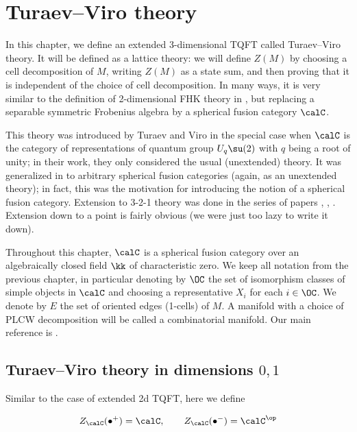 \chapter{Turaev--Viro theory}\label{c:TV}



In this chapter, we define an extended 3-dimensional TQFT called
Turaev--Viro theory. It will be defined as a lattice theory: we will define
$Z(M)$ by choosing a cell decomposition of $M$, writing $Z(M)$ as a state
sum, and then proving that it is independent of the choice of cell
decomposition. In many ways, it is very similar to the definition of
2-dimensional FHK theory in , but replacing a separable
symmetric Frobenius algebra by a spherical fusion category $\calC$.

This theory was introduced by Turaev and Viro \cite{turaev-viro} in the
special case  when $\calC$ is the category of representations of quantum
group $U_q\su(2)$ with $q$ being a root of unity; in their work, they only
considered the usual (unextended) theory. It was generalized in
\cite{barrett} to arbitrary spherical fusion categories (again, as an
unextended theory); in fact, this was the motivation for introducing the
notion of a spherical fusion category. Extension to 3-2-1 theory was done 
in the series of papers \cite{balsam-kirillov}, 
\cite{balsam-TV2}, \cite{balsam-TV3}. 
Extension down to a point is fairly obvious (we were just too lazy to write 
it down).

Throughout this chapter, $\calC$ is a spherical fusion category over an
algebraically closed field $\kk$ of characteristic zero. We keep all
notation from the previous chapter, in particular denoting by $\OC$ the set
of isomorphism classes of simple objects in $\calC$ and choosing a
representative $X_i$ for each $i\in \OC$. We denote by $E$ the set of oriented
 edges (1-cells) of $M$. A manifold with a choice of PLCW decomposition will be 
 called a combinatorial manifold. Our main reference is \cite{balsam-kirillov}.



\section{Turaev--Viro theory in dimensions $0,1$}\label{s:tv-dim01}

Similar to the case of extended 2d TQFT, here we define

$$
Z_\calC(\bullet^+)=\calC, \qquad
Z_\calC(\bullet^-)=\calC^\op
$$


